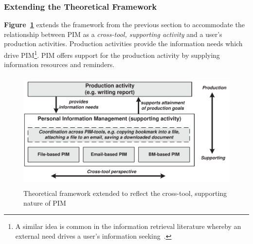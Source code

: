 \subsubsection{Extending the Theoretical Framework}

\textbf{Figure~\ref{fig:design:PIM-production-simple}} extends the framework from the previous section to accommodate the relationship between PIM as a \textit{cross-tool, supporting activity} and a user's production activities.  Production activities provide the information needs which drive PIM\footnote{A similar idea is common in the information retrieval literature whereby an external need drives a user's information seeking~\citep{wilson:00}.}. PIM offers support for the production activity by supplying information resources and reminders.

\begin{figure}[htbp]
	\begin{center}
		\leavevmode
		\includegraphics[height=6cm]{pictures/discussion/PIM-production-rship-pimfocus.pdf}
	\end{center}
	\caption{Theoretical framework extended to reflect the cross-tool, supporting nature of PIM}
	\label{fig:design:PIM-production-simple}
\end{figure}


